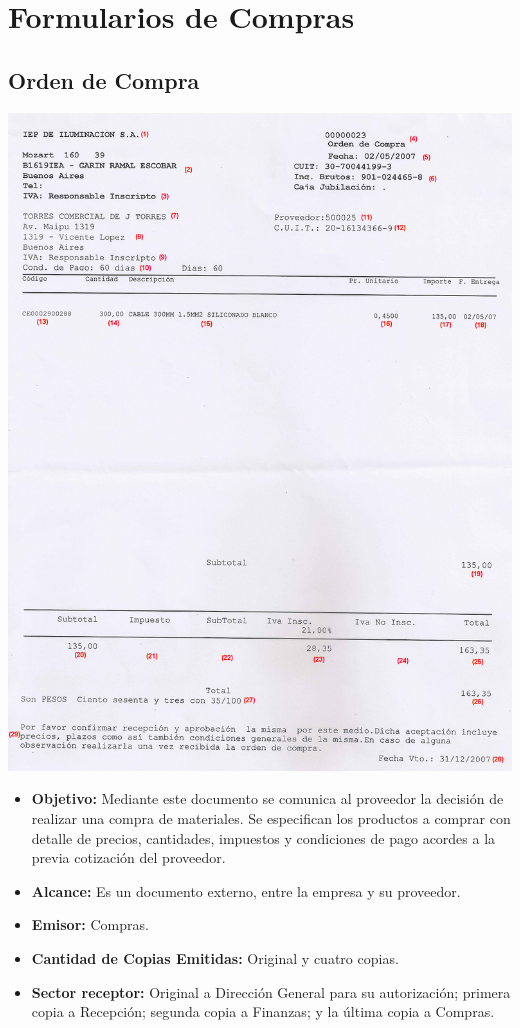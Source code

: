 \pagebreak
\section{Formularios de Compras}
\subsection{Orden de Compra}
\begin{center}
 \includegraphics[scale=3.2, keepaspectratio=true]{./Images/FormulariosIEP/Orden-de-Compra.png}
\end{center}
\begin{itemize}
  \item \textbf{Objetivo:} Mediante este documento se comunica al proveedor la decisión de realizar una compra de materiales. Se especifican los productos a comprar con detalle de precios, cantidades, impuestos y condiciones de pago acordes a la previa cotización del proveedor.
  \item \textbf{Alcance:} Es un documento externo, entre la empresa y su proveedor.
  \item \textbf{Emisor:} Compras.
  \item \textbf{Cantidad de Copias Emitidas:} Original y cuatro copias.
  \item \textbf{Sector receptor:} Original a Dirección General para su autorización; primera copia a Recepci\'on; segunda copia a Finanzas; y la \'ultima copia a Compras.
 \end{itemize}
